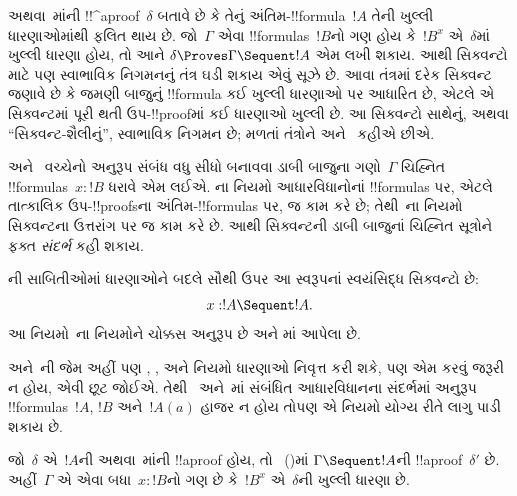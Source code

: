 \documentclass[../../../include/open-logic-section]{subfiles}
\begin{document}


 અથવા~માંની
!!^a{proof}~$\delta$
બતાવે છે કે તેનું
અંતિમ-!!{formula}~$!A$
તેની ખુલ્લી ધારણાઓમાંથી
ફલિત થાય છે.
જો~$\Gamma$ એવા
!!{formula}s~$!B$નો
ગણ હોય કે~$!B^x$
એ~$\delta$માં
ખુલ્લી ધારણા હોય,
તો આને
$\delta \Proves \Gamma
\Sequent !A$ એમ
લખી શકાય.
આથી સિક્વન્ટો માટે
પણ સ્વાભાવિક નિગમનનું
તંત્ર ઘડી શકાય એવું
સૂઝે છે.
આવા તંત્રમાં દરેક
સિક્વન્ટ જણાવે છે કે
જમણી બાજુનું !!{formula}
કઈ ખુલ્લી ધારણાઓ
પર આધારિત છે,
એટલે એ સિક્વન્ટમાં
પૂરી થતી ઉપ-!!{proof}માં
કઈ ધારણાઓ ખુલ્લી છે.
આ સિક્વન્ટો સાથેનું,
અથવા ``સિક્વન્ટ-શૈલીનું'',
સ્વાભાવિક નિગમન છે;
મળતાં તંત્રોને
 અને~
કહીએ છીએ.

 અને~
વચ્ચેનો અનુરૂપ સંબંધ
વધુ સીધો બનાવવા
ડાબી બાજુના ગણો~$\Gamma$
ચિહ્નિત
!!{formula}s~$x:!B$
ધરાવે એમ લઈએ.
ના નિયમો
આધારવિધાનોનાં
!!{formula}s પર,
એટલે તાત્કાલિક
ઉપ-!!{proof}sના
અંતિમ-!!{formula}s પર,
જ કામ કરે છે;
તેથી~ના
નિયમો સિક્વન્ટના
ઉત્તરાંગ પર જ
કામ કરે છે.
આથી સિક્વન્ટની
ડાબી બાજુનાં
ચિહ્નિત સૂત્રોને
ફક્ત \emph{સંદર્ભ}
કહી શકાય.

ની સાબિતીઓમાં
ધારણાઓને બદલે
સૌથી ઉપર
આ સ્વરૂપનાં
સ્વયંસિદ્ધ સિક્વન્ટો છે:
\[x:!A \Sequent !A.\]
આ નિયમો~ના
નિયમોને ચોક્કસ અનુરૂપ
છે અને
માં
આપેલા છે.



 અને~ની
જેમ અહીં પણ
\Intro{\lif}, \Intro{\lnot},
\Elim{\lor} અને
\Elim{\lexists} નિયમો
ધારણાઓ નિવૃત્ત કરી
શકે, પણ એમ કરવું
જરૂરી ન હોય,
એવી છૂટ જોઈએ.
તેથી~
અને~માં
સંબંધિત આધારવિધાનના
સંદર્ભમાં અનુરૂપ
!!{formula}s~$!A$,
$!B$ અને~$!A(a)$
હાજર ન હોય તોપણ
એ નિયમો યોગ્ય રીતે
લાગુ પાડી શકાય છે.

\begin{prop}
જો~$\delta$ એ~$!A$ની
 અથવા~માંની
!!a{proof} હોય,
તો~
()માં
$\Gamma \Sequent !A$ની
!!a{proof}~$\delta'$
છે. અહીં~$\Gamma$
એ એવા બધા~$x:!B$નો
ગણ છે કે~$!B^x$
એ~$\delta$ની
ખુલ્લી ધારણા છે.
\end{prop}
\end{document}
